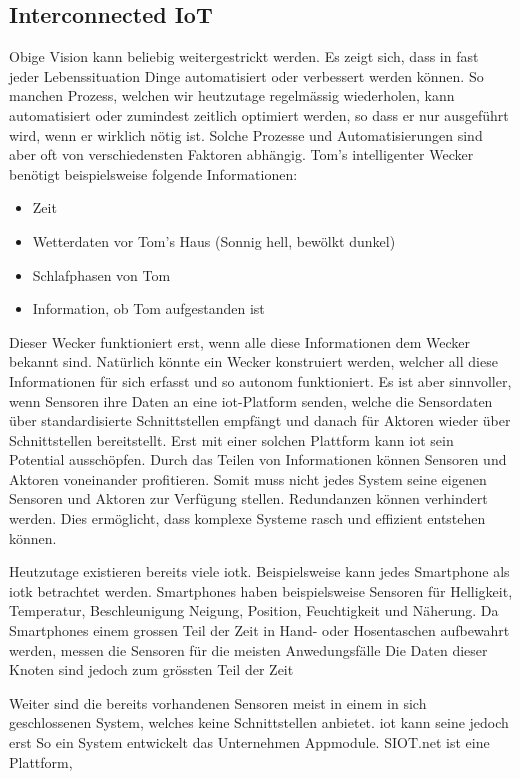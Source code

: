 \subsection{Interconnected IoT}
Obige Vision kann beliebig weitergestrickt werden. Es zeigt sich, dass in fast jeder Lebenssituation Dinge automatisiert oder verbessert werden können. So manchen Prozess, welchen wir heutzutage regelmässig wiederholen, kann automatisiert oder zumindest zeitlich optimiert werden, so dass er nur ausgeführt wird, wenn er wirklich nötig ist. Solche Prozesse und Automatisierungen sind aber oft von verschiedensten Faktoren abhängig. Tom's intelligenter Wecker benötigt beispielsweise folgende Informationen:
\begin{itemize}  
  \item Zeit
  \item Wetterdaten vor Tom's Haus (Sonnig hell, bewölkt dunkel)
  \item Schlafphasen von Tom
  \item Information, ob Tom aufgestanden ist 
\end{itemize}
Dieser Wecker funktioniert erst, wenn alle diese Informationen dem Wecker bekannt sind. Natürlich könnte ein Wecker konstruiert werden, welcher all diese Informationen für sich erfasst und so autonom funktioniert. Es ist aber sinnvoller, wenn Sensoren ihre Daten an eine \gls{iot}-Platform senden, welche die Sensordaten über standardisierte Schnittstellen empfängt und danach für Aktoren wieder über Schnittstellen bereitstellt. Erst mit einer solchen Plattform kann \gls{iot} sein Potential ausschöpfen. Durch das Teilen von Informationen können Sensoren und Aktoren voneinander profitieren.
Somit muss nicht jedes System seine eigenen Sensoren und Aktoren zur Verfügung stellen. Redundanzen können verhindert werden. Dies ermöglicht, dass komplexe Systeme rasch und effizient entstehen können.  

Heutzutage existieren bereits viele \gls{iotk}. Beispielsweise kann jedes Smartphone als \gls{iotk} betrachtet werden. Smartphones haben beispielsweise Sensoren für Helligkeit, Temperatur, Beschleunigung Neigung, Position, Feuchtigkeit und Näherung. Da Smartphones einem grossen Teil der Zeit in Hand- oder Hosentaschen aufbewahrt werden, messen die Sensoren für die meisten Anwedungsfälle 
Die Daten dieser Knoten sind jedoch zum grössten Teil der Zeit   

Weiter sind die bereits vorhandenen Sensoren meist in einem in sich geschlossenen System, welches keine Schnittstellen anbietet. \gls{iot} kann seine  jedoch erst 
So ein System entwickelt das Unternehmen Appmodule. SIOT.net ist eine Plattform, 